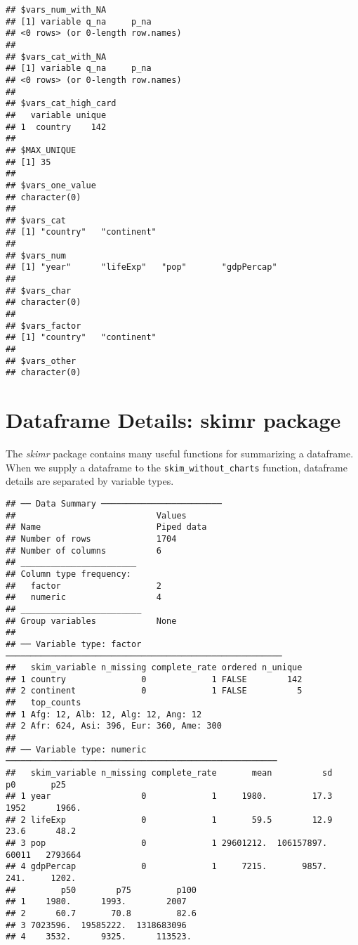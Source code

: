 \documentclass[]{book}
\newenvironment{Shaded}{\begin{snugshade}}{\end{snugshade}}
\newcommand{\KeywordTok}[1]{\textcolor[rgb]{0.13,0.29,0.53}{\textbf{#1}}}
\newcommand{\StringTok}[1]{\textcolor[rgb]{0.31,0.60,0.02}{#1}}
\newcommand{\OperatorTok}[1]{\textcolor[rgb]{0.81,0.36,0.00}{\textbf{#1}}}
\newcommand{\NormalTok}[1]{#1}
\begin{document}
\begin{verbatim}
## $vars_num_with_NA
## [1] variable q_na     p_na    
## <0 rows> (or 0-length row.names)
## 
## $vars_cat_with_NA
## [1] variable q_na     p_na    
## <0 rows> (or 0-length row.names)
## 
## $vars_cat_high_card
##   variable unique
## 1  country    142
## 
## $MAX_UNIQUE
## [1] 35
## 
## $vars_one_value
## character(0)
## 
## $vars_cat
## [1] "country"   "continent"
## 
## $vars_num
## [1] "year"      "lifeExp"   "pop"       "gdpPercap"
## 
## $vars_char
## character(0)
## 
## $vars_factor
## [1] "country"   "continent"
## 
## $vars_other
## character(0)
\end{verbatim}

\section{Dataframe Details: skimr
package}\label{dataframe-details-skimr-package}

The \emph{skimr} package contains many useful functions for summarizing
a dataframe. When we supply a dataframe to the
\texttt{skim\_without\_charts} function, dataframe details are separated
by variable types.

\begin{Shaded}
\end{Shaded}

\begin{verbatim}
## ── Data Summary ────────────────────────
##                            Values    
## Name                       Piped data
## Number of rows             1704      
## Number of columns          6         
## _______________________              
## Column type frequency:               
##   factor                   2         
##   numeric                  4         
## ________________________             
## Group variables            None      
## 
## ── Variable type: factor ───────────────────────────────────────────────────────
##   skim_variable n_missing complete_rate ordered n_unique
## 1 country               0             1 FALSE        142
## 2 continent             0             1 FALSE          5
##   top_counts                            
## 1 Afg: 12, Alb: 12, Alg: 12, Ang: 12    
## 2 Afr: 624, Asi: 396, Eur: 360, Ame: 300
## 
## ── Variable type: numeric ──────────────────────────────────────────────────────
##   skim_variable n_missing complete_rate       mean          sd      p0       p25
## 1 year                  0             1     1980.         17.3  1952      1966. 
## 2 lifeExp               0             1       59.5        12.9    23.6      48.2
## 3 pop                   0             1 29601212.  106157897.  60011   2793664  
## 4 gdpPercap             0             1     7215.       9857.    241.     1202. 
##         p50        p75         p100
## 1    1980.      1993.        2007  
## 2      60.7       70.8         82.6
## 3 7023596.  19585222.  1318683096  
## 4    3532.      9325.      113523.
\end{verbatim}
\end{document}
